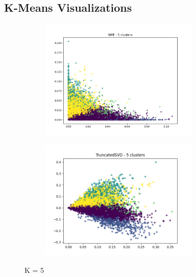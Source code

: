 \documentclass[11pt]{article}
\begin{document}
\newpage
\begin{appendices}
\section{K-Means Visualizations} \label{outputs}

\begin{figure}[H]
\centering
\begin{subfigure}{\textwidth}
  \centering
  \includegraphics[width=3in]{images/nmf_5.png}
  \label{fig:nmf5}
\end{subfigure}%
\begin{subfigure}{\textwidth}
  \centering
  \includegraphics[width=3in]{images/svd_5.png}
  \label{fig:svd5}
\end{subfigure}
\caption{K = 5}
\label{fig:k5}
\end{figure}


\end{appendices}
\end{document}
